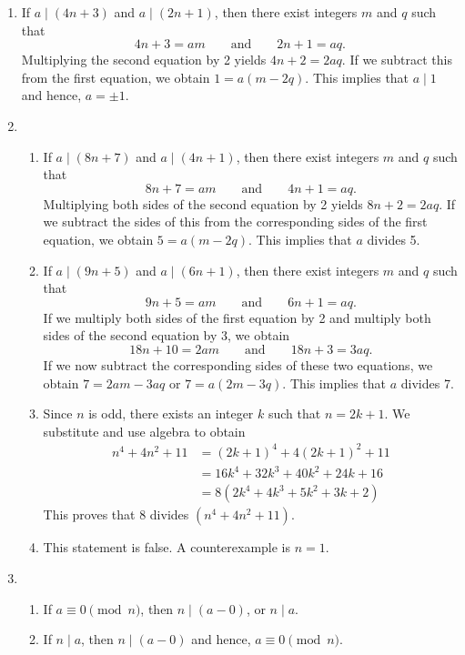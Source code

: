 \begin{enumerate}
\item If $a \mid ( 4n + 3 )$ and $a \mid ( 2n + 1 )$, then there exist integers $m$ and $q$ such that
\[
4n + 3 = am \qquad \text{and} \qquad 2n + 1 = aq.
\]
Multiplying the second equation by 2 yields $4n + 2 = 2aq$.  If we subtract this from the first equation, we obtain $1 = a ( m - 2q )$.  This implies that $a \mid 1$ and hence, 
$a = \pm 1$.


\item \begin{enumerate}
\item If $a \mid ( 8n + 7 )$ and $a \mid ( 4n + 1 )$, then there exist integers $m$ and $q$ such that
\[
8n + 7 = am \qquad \text{and} \qquad 4n + 1 = aq.
\]
Multiplying both sides of the second equation by 2 yields $8n + 2 = 2aq$.  If we subtract the sides of this from the corresponding sides of the first equation, we obtain $5 = a ( m - 2q )$.  This implies that $a$ divides 5. 

\item If $a \mid ( 9n + 5 )$ and $a \mid ( 6n + 1 )$, then there exist integers $m$ and $q$ such that
\[
9n + 5 = am \qquad \text{and} \qquad 6n + 1 = aq.
\]
If we multiply both sides of the first equation by 2 and multiply both sides of the second equation by 3, we obtain
\[
18n + 10 = 2am \qquad \text{and} \qquad 18n + 3 = 3aq.
\]
If we now subtract the corresponding sides of these two equations, we obtain $7 = 2am - 3 aq$ or 
$7 = a(2m - 3q)$.  This implies that $a$ divides 7. 

\item Since $n$ is odd, there exists an integer $k$ such that $n = 2k + 1$.  We substitute and use algebra to obtain
\begin{align*}
n^4 + 4n^2 + 11 &= (2k + 1)^4 + 4(2k + 1)^2 + 11 \\
                &= 16k^4 + 32k^3 + 40k^2 + 24k + 16 \\
                &= 8 \left( 2k^4 + 4k^3 + 5k^2 + 3k + 2 \right)
\end{align*}
This proves that 8 divides $\left( n^4 + 4n^2 + 11 \right)$.

\item This statement is false.  A counterexample is $n = 1$.
\end{enumerate}



\item \begin{enumerate}
\item If $a \equiv 0 \pmod n$, then $n \mid \left( a - 0 \right)$, or $n \mid a$.
\item If $n \mid a$, then $n \mid \left( a - 0 \right)$ and hence, $a \equiv 0 \pmod n$.
\end{enumerate}




\end{enumerate}
